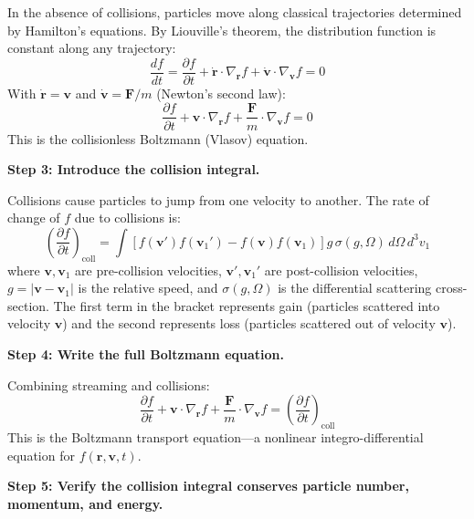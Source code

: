 \documentclass[11pt,openright]{book}
\begin{document}
In the absence of collisions, particles move along classical trajectories determined by Hamilton's equations. By Liouville's theorem, the distribution function is constant along any trajectory:
\begin{equation}
\frac{df}{dt} = \frac{\partial f}{\partial t} + \dot{\mathbf{r}}\cdot\nabla_{\mathbf{r}} f + \dot{\mathbf{v}}\cdot\nabla_{\mathbf{v}} f = 0
\end{equation}
With $\dot{\mathbf{r}} = \mathbf{v}$ and $\dot{\mathbf{v}} = \mathbf{F}/m$ (Newton's second law):
\begin{equation}
\frac{\partial f}{\partial t} + \mathbf{v}\cdot\nabla_{\mathbf{r}} f + \frac{\mathbf{F}}{m}\cdot\nabla_{\mathbf{v}} f = 0
\end{equation}
This is the collisionless Boltzmann (Vlasov) equation.

\textbf{Step 3: Introduce the collision integral.}

Collisions cause particles to jump from one velocity to another. The rate of change of $f$ due to collisions is:
\begin{equation}
\left(\frac{\partial f}{\partial t}\right)_{\text{coll}} = \int\left[f(\mathbf{v}')f(\mathbf{v}_1') - f(\mathbf{v})f(\mathbf{v}_1)\right]g\,\sigma(g,\Omega)\,d\Omega\,d^3v_1
\end{equation}
where $\mathbf{v},\mathbf{v}_1$ are pre-collision velocities, $\mathbf{v}',\mathbf{v}_1'$ are post-collision velocities, $g = |\mathbf{v} - \mathbf{v}_1|$ is the relative speed, and $\sigma(g,\Omega)$ is the differential scattering cross-section. The first term in the bracket represents gain (particles scattered into velocity $\mathbf{v}$) and the second represents loss (particles scattered out of velocity $\mathbf{v}$).

\textbf{Step 4: Write the full Boltzmann equation.}

Combining streaming and collisions:
\begin{equation}
\frac{\partial f}{\partial t} + \mathbf{v}\cdot\nabla_{\mathbf{r}} f + \frac{\mathbf{F}}{m}\cdot\nabla_{\mathbf{v}} f = \left(\frac{\partial f}{\partial t}\right)_{\text{coll}}
\end{equation}
This is the Boltzmann transport equation---a nonlinear integro-differential equation for $f(\mathbf{r},\mathbf{v},t)$.

\textbf{Step 5: Verify the collision integral conserves particle number, momentum, and energy.}
\end{document}
